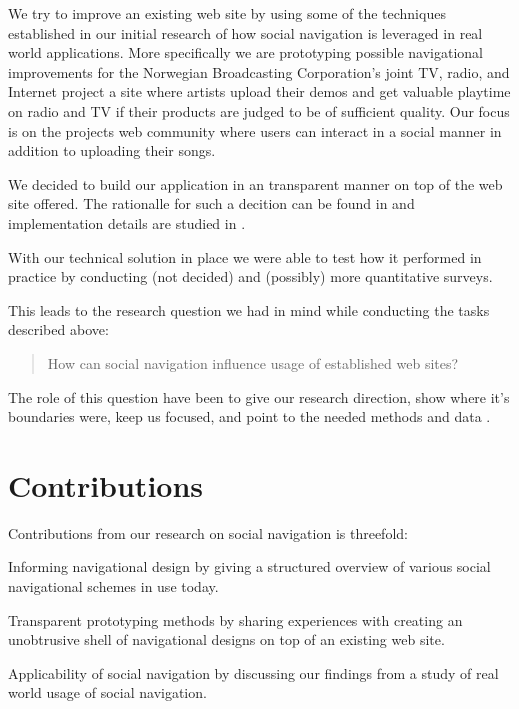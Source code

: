 We try to improve an existing web site by using some of the techniques
established in our initial research of how social navigation is leveraged
in real world applications. More specifically we are prototyping possible
navigational improvements for the Norwegian Broadcasting Corporation's joint
TV, radio, and Internet project \project{\urort}\dash{}a site where artists
upload their demos and get valuable playtime on radio and TV if their products
are judged to be of sufficient quality. Our focus is on the projects web
community%
where users can interact in a social manner in addition to uploading
their songs.

We decided to build our application in an transparent manner on top of the
web site \urort offered. The rationalle for such a decition can be found in
 and implementation details are studied
in .

With our technical solution in place we were able to test how it performed in
practice by conducting  (not decided) and
(possibly) more quantitative surveys.

This leads to the research question we had in mind while conducting
the tasks described above:

\begin{quote}
  How can social navigation influence usage of established web sites?
\end{quote}

The role of this question have been to give our research direction, show where
it's boundaries were, keep us focused, and point to the needed methods and
data \citep[p.~77]{silverman05}.


\section{Contributions}

Contributions from our research on social navigation is threefold:

\begin{desc}
  \item[Informing navigational design] by giving a structured overview of
    various social navigational schemes in use today.
  \item[Transparent prototyping methods] by sharing experiences with
    creating an unobtrusive shell of navigational designs on top of an
    existing web site.
  \item[Applicability of social navigation] by discussing our findings from
    a study of real world usage of social navigation.
\end{desc}

